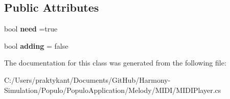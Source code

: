 \subsection*{Public Attributes}
\begin{DoxyCompactItemize}
\item 
\hypertarget{class_populo_application_1_1_m_i_d_i_player_a8589d2ae5ef8efb531878c1444393699}{bool {\bfseries need} =true}\label{class_populo_application_1_1_m_i_d_i_player_a8589d2ae5ef8efb531878c1444393699}

\item 
\hypertarget{class_populo_application_1_1_m_i_d_i_player_aa46eb8a190ba7c6186d9ea836ebe4a74}{bool {\bfseries adding} = false}\label{class_populo_application_1_1_m_i_d_i_player_aa46eb8a190ba7c6186d9ea836ebe4a74}

\end{DoxyCompactItemize}


The documentation for this class was generated from the following file\+:\begin{DoxyCompactItemize}
\item 
C\+:/\+Users/praktykant/\+Documents/\+Git\+Hub/\+Harmony-\/\+Simulation/\+Populo/\+Populo\+Application/\+Melody/\+M\+I\+D\+I/M\+I\+D\+I\+Player.\+cs\end{DoxyCompactItemize}
